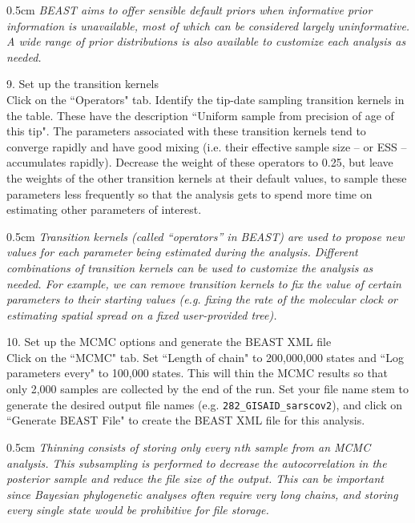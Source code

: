 \documentclass{article}
\newcommand{\ann}[1]{
\begin{adjustwidth}{0.5cm}{}
\it{#1}\\
\end{adjustwidth}}
\begin{document}
\ann{BEAST aims to offer sensible default priors when informative prior information is unavailable, most of which can be considered largely uninformative. A wide range of prior distributions is also available to customize each analysis as needed.}

9. Set up the transition kernels \\

Click on the ``Operators" tab. Identify the tip-date sampling transition kernels in the table.
These have the description ``Uniform sample from precision of age of this tip".
The parameters associated with these transition kernels tend to converge rapidly and have good mixing (i.e. their effective sample size -- or ESS -- accumulates rapidly).
Decrease the weight of these operators to 0.25, but leave the weights of the other transition kernels at their default values, to sample these parameters less frequently so that the analysis gets to spend more time on estimating other parameters of interest.\\

\ann{Transition kernels (called ``operators'' in BEAST) are used to propose new values for each parameter being estimated during the analysis.
Different combinations of transition kernels can be used to customize the analysis as needed. For example, we can remove transition kernels to fix the value of certain parameters to
their starting values (e.g. fixing the rate of the molecular clock or estimating spatial spread on a fixed user-provided tree).}

10. Set up the MCMC options and generate the BEAST XML file\\

Click on the ``MCMC" tab. Set ``Length of chain" to 200,000,000 states and ``Log parameters every" to 100,000 states.
This will thin the MCMC results so that only 2,000 samples are collected by the end of the run.
Set your file name stem to generate the desired output file names (e.g. \texttt{282\_GISAID\_sarscov2}), and click on ``Generate BEAST File" to create the BEAST XML file for this analysis.\\

\ann{Thinning consists of storing only every $n$th sample from an MCMC analysis. This subsampling is performed to decrease the autocorrelation in the posterior sample and reduce the file size of the output. This can be important since Bayesian phylogenetic analyses often require very long chains, and storing every single state would be prohibitive for file storage.}
\end{document}
